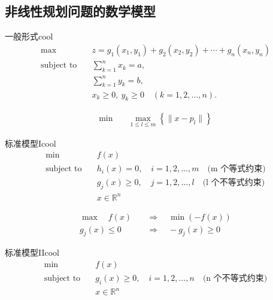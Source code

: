 \subsection{非线性规划问题的数学模型}
\begin{thmbox}{一般形式}{cool}
    \begin{align*}
        \text{max} \quad & z = g_1(x_1, y_1) + g_2(x_2, y_2) + \cdots + g_n(x_n, y_n) \\
        \text{subject to} \quad & \sum_{k=1}^{n} x_k = a, \\
        & \sum_{k=1}^{n} y_k = b, \\
        & x_k \geq 0, \ y_k \geq 0 \quad (k = 1, 2, \dots, n).
        \end{align*}
        
        \begin{align*}
        \text{min} \quad & \max_{1 \leq l \leq m} \left\{ \| x - p_l \| \right\}
    \end{align*}
\end{thmbox}
\begin{thmbox}{标准模型I}{cool}
    \begin{align*}
        \min \quad & f(x) \\
        \text{subject to} \quad & h_i(x) = 0, \quad i = 1, 2, \dots, m \quad \text{(m 个等式约束)} \\
        & g_j(x) \geq 0, \quad j = 1, 2, \dots, l \quad \text{(l 个不等式约束)} \\
        & x \in \mathbb{R}^n
        \end{align*}
        
        \bigskip
        \begin{align*}
        \max \quad  f(x) \quad &\Rightarrow \quad \min (-f(x)) \\
        g_j(x) \leq 0  \quad &\Rightarrow \quad -g_j(x) \geq 0
        \end{align*}
\end{thmbox}
\begin{thmbox}{标准模型II}{cool}
    \begin{align*}
        \min \quad & f(x) \\
        \text{subject to} \quad & g_i(x) \geq 0, \quad i = 1, 2, \dots, n \quad \text{(n 个不等式约束)} \\
        & x \in \mathbb{R}^n
    \end{align*}
\end{thmbox}


